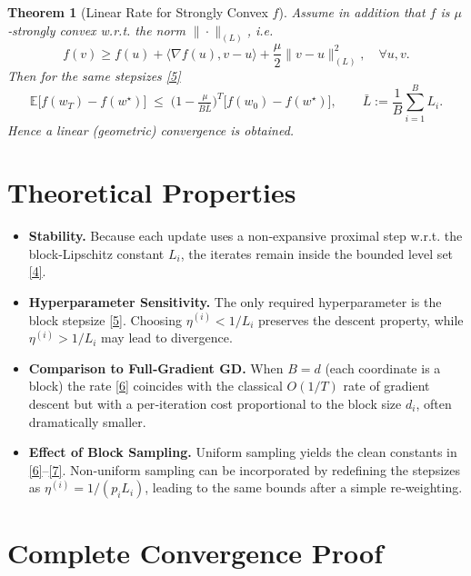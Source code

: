 \documentclass[11pt]{article}
\newtheorem{theorem}{Theorem}[section]
\begin{document}
\begin{theorem}[Linear Rate for Strongly Convex $f$]\label{thm:strong}
Assume in addition that $f$ is $\mu$‑strongly convex w.r.t. the norm
$\|\cdot\|_{(L)}$, i.e.
\[
f(v)\ge f(u)+\langle \nabla f(u),v-u\rangle+\frac{\mu}{2}\|v-u\|_{(L)}^{2},
\quad\forall u,v.
\]
Then for the same stepsizes \eqref{5}
\[
\mathbb{E}\!\bigl[f(w_T)-f(w^\star)\bigr]
\;\le\;
\bigl(1-\tfrac{\mu}{B\bar L}\bigr)^{T}
\bigl[f(w_0)-f(w^\star)\bigr],
\qquad
\bar L:=\frac{1}{B}\sum_{i=1}^B L_i .
\tag{7}
\]
Hence a linear (geometric) convergence is obtained.
\end{theorem}

\section{Theoretical Properties}

\begin{itemize}[leftmargin=*]
\item \textbf{Stability.} Because each update uses a non‑expansive
proximal step w.r.t. the block‑Lipschitz constant $L_i$, the iterates remain
inside the bounded level set \eqref{4}.
\item \textbf{Hyperparameter Sensitivity.}
The only required hyperparameter is the block stepsize \eqref{5}.
Choosing $\eta^{(i)}<1/L_i$ preserves the descent property, while
$\eta^{(i)}>1/L_i$ may lead to divergence.
\item \textbf{Comparison to Full‑Gradient GD.}
When $B=d$ (each coordinate is a block) the rate \eqref{6} coincides with the
classical $O(1/T)$ rate of gradient descent but with a per‑iteration cost
proportional to the block size $d_i$, often dramatically smaller.
\item \textbf{Effect of Block Sampling.}
Uniform sampling yields the clean constants in \eqref{6}–\eqref{7}.
Non‑uniform sampling can be incorporated by redefining the stepsizes as
$\eta^{(i)}=1/(p_i L_i)$, leading to the same bounds after a simple
re‑weighting.
\end{itemize}

\section*{Complete Convergence Proof}
\end{document}
